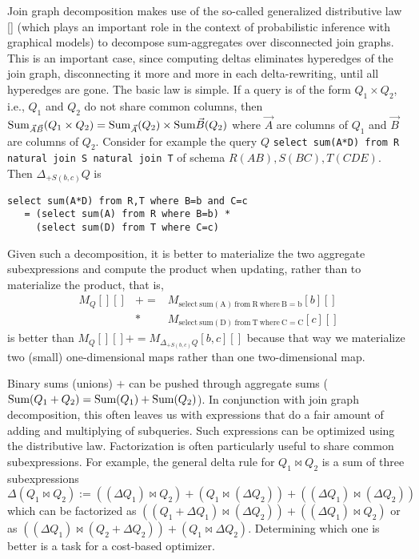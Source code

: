 Join graph decomposition makes use of the so-called generalized distributive law [] (which plays
an important role in the context of probabilistic inference with graphical models) to decompose
sum-aggregates over disconnected join graphs. This is an important case, since computing deltas 
eliminates hyperedges of the join graph, disconnecting it more and more in each delta-rewriting, until all
hyperedges are gone. The basic law is simple. If a query is of the form $Q_1 \times Q_2$, i.e., $Q_1$ and
$Q_2$ do not share common columns, then
$\mbox{Sum}_{\vec{A}\vec{B}}(Q_1 \times Q_2) = \mbox{Sum}_{\vec{A}}(Q_2) \times \mbox{Sum}{\vec{B}}(Q_2)$
where $\vec{A}$ are columns of $Q_1$ and $\vec{B}$ are columns of $Q_2.$
Consider for example the query $Q$
{\tt select sum(A*D) from R natural join S natural join T}
of schema $R(AB), S(BC), T(CDE)$. Then
$\Delta_{+S(b,c)} Q$ is
\vspace{-1mm}
\begin{verbatim}
select sum(A*D) from R,T where B=b and C=c
   = (select sum(A) from R where B=b) *
     (select sum(D) from T where C=c)
\end{verbatim}
\vspace{-1mm}
Given such a decomposition, it is better to materialize the two aggregate subexpressions and compute
the product when updating, rather than to materialize the product, that is,
\begin{eqnarray*}
M_Q[][] &+=& M_{\mathrm{select~sum(A)~from~R~where~B=b}}[b][] \\
&*& M_{\mathrm{select~sum(D)~from~T~where~C=C}}[c][]
\end{eqnarray*}
is better than
$M_Q[][] += M_{\Delta_{+S(b,c)} Q}[b,c][]$ because that way we materialize two (small) one-dimensional
maps rather than one two-dimensional map.

Binary sums  (unions) $+$ can be pushed through aggregate sums ($\mbox{Sum}(Q_1 + Q_2) = \mbox{Sum}(Q_1) + \mbox{Sum}(Q_2)$).
In conjunction with join graph decomposition, this often leaves us with expressions that do a fair amount
of adding and multiplying of subqueries. Such expressions can be optimized using the distributive law.
Factorization is often particularly useful to share common subexpressions.
For example, the general delta rule for $Q_1 \bowtie Q_2$ is a sum of three subexpressions
$\Delta(Q_1 \bowtie Q_2) := ((\Delta Q_1) \bowtie Q_2) + (Q_1 \bowtie (\Delta Q_2))
 + ((\Delta Q_1) \bowtie (\Delta Q_2))$ which can be factorized as
$((Q_1 + \Delta Q_1) \bowtie (\Delta Q_2)) + ((\Delta Q_1) \bowtie  Q_2)$
or as
$((\Delta Q_1) \bowtie (Q_2 + \Delta Q_2)) + (Q_1 \bowtie \Delta Q_2)$.
Determining which one is better is a task for a cost-based optimizer.







